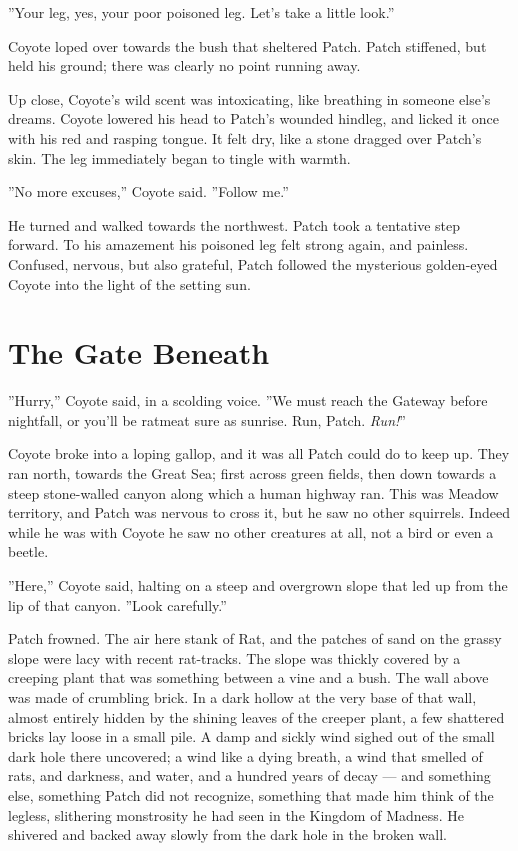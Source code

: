 \documentclass[12pt]{book}
\begin{document}
''Your leg, yes, your poor poisoned leg. Let's take a little look.''

Coyote loped over towards the bush that sheltered Patch. Patch
stiffened, but held his ground; there was clearly no point running
away.

Up close, Coyote's wild scent was intoxicating, like breathing in
someone else's dreams. Coyote lowered his head to Patch's wounded
hindleg, and licked it once with his red and rasping tongue. It felt
dry, like a stone dragged over Patch's skin. The leg immediately began
to tingle with warmth.

''No more excuses,'' Coyote said. ''Follow me.''

He turned and walked towards the northwest. Patch took a tentative
step forward. To his amazement his poisoned leg felt strong again, and
painless. Confused, nervous, but also grateful, Patch followed the
mysterious golden-eyed Coyote into the light of the setting sun.


\section{The Gate Beneath}

''Hurry,'' Coyote said, in a scolding voice. ''We must reach the
Gateway before nightfall, or you'll be ratmeat sure as sunrise. Run,
Patch. \textit{Run!}''

Coyote broke into a loping gallop, and it was all Patch could do to
keep up. They ran north, towards the Great Sea; first across green
fields, then down towards a steep stone-walled canyon along which a
human highway ran. This was Meadow territory, and Patch was nervous to
cross it, but he saw no other squirrels. Indeed while he was with
Coyote he saw no other creatures at all, not a bird or even a beetle.

''Here,'' Coyote said, halting on a steep and overgrown slope that led
up from the lip of that canyon. ''Look carefully.''

Patch frowned. The air here stank of Rat, and the patches of sand on
the grassy slope were lacy with recent rat-tracks. The slope was
thickly covered by a creeping plant that was something between a vine
and a bush. The wall above was made of crumbling brick. In a dark
hollow at the very base of that wall, almost entirely hidden by the
shining leaves of the creeper plant, a few shattered bricks lay loose
in a small pile. A damp and sickly wind sighed out of the small dark
hole there uncovered; a wind like a dying breath, a wind that smelled
of rats, and darkness, and water, and a hundred years of decay --- and
something else, something Patch did not recognize, something that made
him think of the legless, slithering monstrosity he had seen in the
Kingdom of Madness. He shivered and backed away slowly from the dark
hole in the broken wall.
\end{document}
